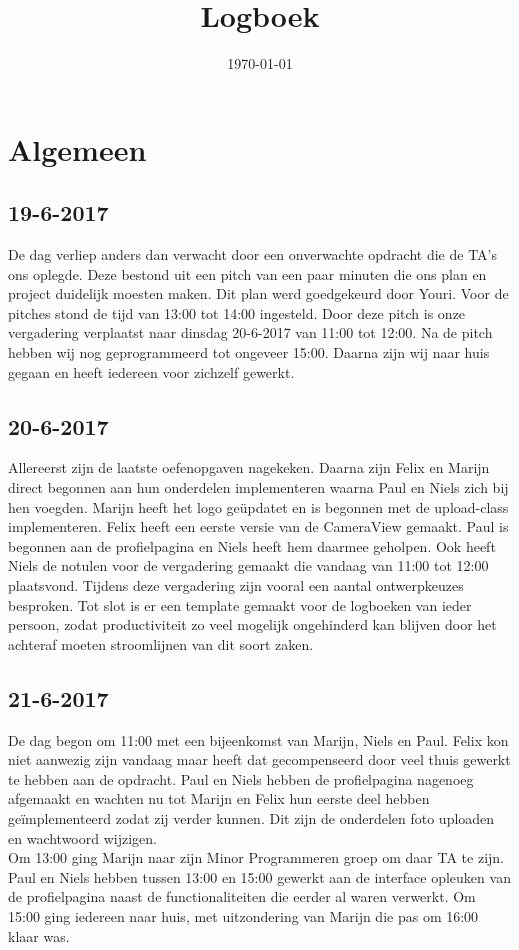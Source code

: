 \documentclass{uva-inf-article}
\title{Logboek}
\date{\today}
\begin{document}
\maketitle

\section{Algemeen}
\subsection{19-6-2017}
De dag verliep anders dan verwacht door een onverwachte opdracht die de TA's ons oplegde. Deze bestond uit een pitch van een paar minuten die ons plan en project 
duidelijk moesten maken. Dit plan werd goedgekeurd door Youri. Voor de pitches stond de tijd van 13:00 tot 14:00 ingesteld. Door deze pitch is onze vergadering verplaatst naar dinsdag 20-6-2017 van 11:00 tot 12:00.
Na de pitch hebben wij nog geprogrammeerd tot ongeveer 15:00. Daarna zijn wij naar huis gegaan en heeft iedereen voor zichzelf gewerkt.
\subsection{20-6-2017}
Allereerst zijn de laatste oefenopgaven nagekeken. Daarna zijn Felix en Marijn direct begonnen aan hun onderdelen implementeren waarna Paul en Niels zich bij hen voegden. Marijn heeft het logo ge\"updatet en is begonnen met de upload-class implementeren. Felix heeft een eerste versie van de CameraView gemaakt.
Paul is begonnen aan de profielpagina en Niels heeft hem daarmee geholpen. Ook heeft Niels de notulen voor de vergadering gemaakt die vandaag van 11:00 tot 12:00 plaatsvond. Tijdens deze vergadering zijn vooral een aantal ontwerpkeuzes besproken. Tot slot is er een template gemaakt voor de logboeken van ieder persoon, zodat productiviteit zo veel mogelijk ongehinderd kan blijven door het achteraf moeten stroomlijnen van dit soort zaken.
\subsection{21-6-2017}
De dag begon om 11:00 met een bijeenkomst van Marijn, Niels en Paul. Felix kon niet aanwezig zijn vandaag maar heeft dat gecompenseerd door veel thuis gewerkt te hebben aan de opdracht. Paul en Niels hebben de profielpagina nagenoeg afgemaakt en wachten nu tot Marijn en Felix hun eerste deel hebben ge\"implementeerd zodat zij verder kunnen. Dit zijn de onderdelen foto uploaden en wachtwoord wijzigen.\\
Om 13:00 ging Marijn naar zijn Minor Programmeren groep om daar TA te zijn. Paul en Niels hebben tussen 13:00 en 15:00 gewerkt aan de interface opleuken van de profielpagina naast de functionaliteiten die eerder al waren verwerkt.
Om 15:00 ging iedereen naar huis, met uitzondering van Marijn die pas om 16:00 klaar was.
\end{document}
